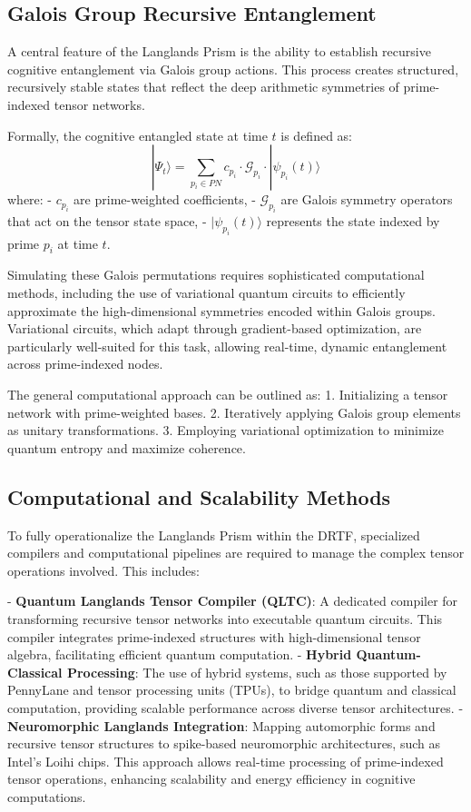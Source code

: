\documentclass[11pt]{article}
\begin{document}
\subsection{Galois Group Recursive Entanglement}

A central feature of the Langlands Prism is the ability to establish recursive cognitive entanglement via Galois group actions. This process creates structured, recursively stable states that reflect the deep arithmetic symmetries of prime-indexed tensor networks.

Formally, the cognitive entangled state at time \(t\) is defined as:
\[
|\Psi_t\rangle = \sum_{p_i \in PN} c_{p_i} \cdot \mathcal{G}_{p_i} \cdot |\psi_{p_i}(t)\rangle
\]
where:
- \(c_{p_i}\) are prime-weighted coefficients,
- \(\mathcal{G}_{p_i}\) are Galois symmetry operators that act on the tensor state space,
- \(|\psi_{p_i}(t)\rangle\) represents the state indexed by prime \(p_i\) at time \(t\).

Simulating these Galois permutations requires sophisticated computational methods, including the use of variational quantum circuits to efficiently approximate the high-dimensional symmetries encoded within Galois groups. Variational circuits, which adapt through gradient-based optimization, are particularly well-suited for this task, allowing real-time, dynamic entanglement across prime-indexed nodes.

The general computational approach can be outlined as:
1. Initializing a tensor network with prime-weighted bases.
2. Iteratively applying Galois group elements as unitary transformations.
3. Employing variational optimization to minimize quantum entropy and maximize coherence.

\subsection{Computational and Scalability Methods}

To fully operationalize the Langlands Prism within the DRTF, specialized compilers and computational pipelines are required to manage the complex tensor operations involved. This includes:

- \textbf{Quantum Langlands Tensor Compiler (QLTC)}: A dedicated compiler for transforming recursive tensor networks into executable quantum circuits. This compiler integrates prime-indexed structures with high-dimensional tensor algebra, facilitating efficient quantum computation.
- \textbf{Hybrid Quantum-Classical Processing}: The use of hybrid systems, such as those supported by PennyLane and tensor processing units (TPUs), to bridge quantum and classical computation, providing scalable performance across diverse tensor architectures.
- \textbf{Neuromorphic Langlands Integration}: Mapping automorphic forms and recursive tensor structures to spike-based neuromorphic architectures, such as Intel's Loihi chips. This approach allows real-time processing of prime-indexed tensor operations, enhancing scalability and energy efficiency in cognitive computations.
\end{document}
